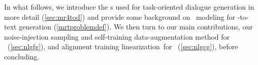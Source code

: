 
%
%

In what follows, we introduce the \meaningrepresentation s used 
for task-oriented
dialogue generation in more detail (\autoref{sec:mr4tod}) and provide
some background on \sequencetosequence~modeling for 
\meaningrepresentation-to-text generation (\autoref{mrtproblemdef}). We then turn
to our main contributions,
our noise-injection sampling and self-training data-augmentation method 
for \faithfulgeneration~(\autoref{sec:nlgfg}),
and alignment training linearization~for \controllablegeneration~(\autoref{sec:nlgcg}), before concluding.

